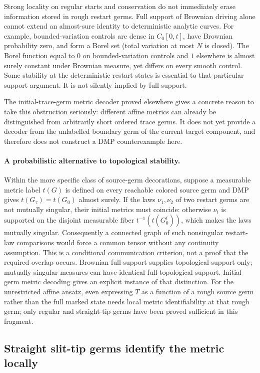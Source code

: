 \documentclass[11pt]{article}
\theoremstyle{definition}\newtheorem{definition}[theorem]{Definition}
\theoremstyle{remark}\newtheorem{remark}[theorem]{Remark}
\begin{document}
Strong locality on regular starts and conservation do not immediately erase
information stored in rough restart germs. Full support of Brownian driving
alone cannot extend an almost-sure identity to deterministic analytic curves.
For example, bounded-variation controls are dense in $C_0[0,t]$, have Brownian
probability zero, and form a Borel set (total variation at most $N$ is closed).
The Borel function equal to $0$ on bounded-variation controls and $1$ elsewhere
is almost surely constant under Brownian measure, yet differs on every smooth
control. Some stability at the deterministic restart states is essential to
that particular support argument. It is not silently implied by full support.

The initial-trace-germ metric decoder proved elsewhere gives a concrete reason
to take this obstruction seriously: different affine metrics can already be
distinguished from arbitrarily short ordered trace germs. It does not yet
provide a decoder from the unlabelled boundary germ of the current target
component, and therefore does not construct a DMP counterexample here.


\paragraph{A probabilistic alternative to topological stability.}
Within the more specific class of source-germ decorations, suppose a measurable
metric label $t(G)$ is defined on every reachable colored source germ and
DMP gives $t(G_\tau)=t(G_0)$ almost surely. If the laws $\nu_1,\nu_2$ of two
restart germs are not mutually singular, their initial metrics must coincide:
otherwise $\nu_i$ is supported on the disjoint measurable fiber
$t^{-1}(t(G_0^i))$, which makes the laws mutually singular.
Consequently a connected graph of such nonsingular restart-law comparisons
would force a common tensor without any continuity assumption.
This is a conditional communication criterion, not a proof that the required
overlap occurs. Brownian full support supplies topological support only;
mutually singular measures can have identical full topological support.
Initial-germ metric decoding gives an explicit instance of that distinction.
For the unrestricted affine ansatz, even expressing $T$ as a function of a
rough source germ rather than the full marked state needs local metric
identifiability at that rough germ; only regular and straight-tip germs have
been proved sufficient in this fragment.

\subsection{Straight slit-tip germs identify the metric locally}
\end{document}
